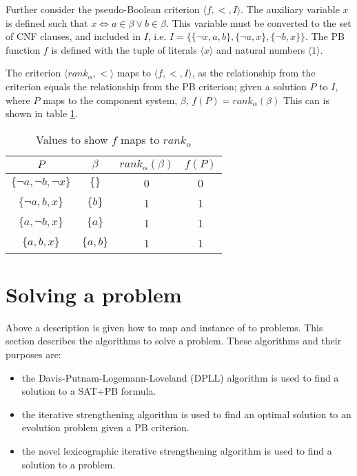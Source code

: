 Further consider the pseudo-Boolean criterion $\langle f, < , I \rangle$.
The auxiliary variable $x$ is defined such that $x \Leftrightarrow a \in \beta \vee b \in \beta$.
This variable must be  converted to the set of CNF clauses, and included in $I$,
i.e. $I = \{\{\neg x, a,b\}, \{\neg a,x\}, \{\neg b, x \}\}$.
The PB function $f$ is defined with the tuple of literals $\langle x \rangle$ and natural numbers $\langle 1 \rangle$.

The criterion $\langle rank_{\alpha},< \rangle$ maps to $\langle f, < , I \rangle$,
as the relationship from the criterion equals the relationship from the PB criterion;
given a solution $P$ to $I$, where $P$ maps to the component system, $\beta$, $f(P) = rank_{\alpha}(\beta)$
This can is shown in table \ref{impl.critmapexmp}.
\begin{table}[h!]
\centering
\begin{tabular}{| c | c | c | c |}
\hline
$P$                                &    $\beta$            & $rank_{\alpha}(\beta)$     & $f(P)$\\ \hline    
$\{\neg a, \neg b, \neg x\}$     & $\{\}$                & 0                        & 0 \\
$\{\neg a,  b, x\}$             & $\{b\}$                & 1                        & 1 \\
$\{ a,  \neg b, x\}$             & $\{a\}$                & 1                        & 1 \\
$\{ a,  b, x\}$                 & $\{a,b\}$                & 1                        & 1 \\ \hline
\end{tabular}
\caption{Values to show $f$  maps to $rank_{\alpha}$}
\label{impl.critmapexmp}
\end{table}


\section{Solving a \modelimpl problem}
\label{impl.algorithms}
Above a description is given how to map and instance of \modelname to \modelimpl problems.
This section describes the algorithms to solve a \modelimpl problem.
These algorithms and their purposes are:
\begin{itemize}
  \item the Davis-Putnam-Logemann-Loveland (DPLL) algorithm \citep{Davis1960, davis1962machine}  is used to find a solution to a SAT+PB formula.
  \item the iterative strengthening algorithm \citep{calistri1994iterative, le2010sat4j} is used to find an optimal solution to an evolution problem given a PB criterion.
  \item the novel lexicographic iterative strengthening algorithm is used to find a solution to a \modelimpl problem.
\end{itemize}

